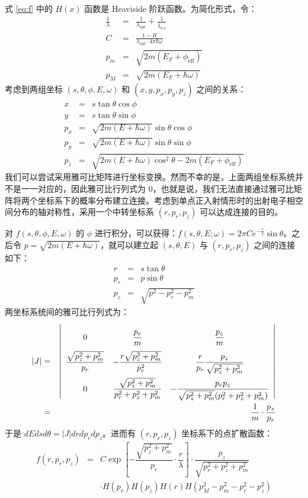 式 \ref{eq:f} 中的 $H(x)$ 函数是 Heaviside 阶跃函数。为简化形式，令：
\begin{eqnarray}
\frac{1}{\lambda} &=& \frac{1}{\lambda_{\text{opt}}} + \frac{1}{\bar{\lambda}_{\text{e-e}}}\nonumber\\
C &=& \frac{1-R}{\lambda_{\text{opt}}\cdot 4\pi\hbar\omega}\\
p_m &=& \sqrt{2m(E_F+\phi_{\text{eff}})}\nonumber\\
p_M &=& \sqrt{2m(E_F+\hbar\omega)}\nonumber
\label{eq:pm}
\end{eqnarray}
考虑到两组坐标 $(s, \theta, \phi, E, \omega)$ 和 $(x, y, p_x, p_y, p_z)$ 之间的关系：
\begin{eqnarray}
x &=& s\tan\theta\cos\phi\nonumber\\
y &=& s\tan\theta\sin\phi \nonumber\\
p_x &=& \sqrt{2m(E+\hbar\omega)}\sin\theta\cos\phi\\
p_y &=& \sqrt{2m(E+\hbar\omega)}\sin\theta\sin\phi\nonumber\\
p_z &=& \sqrt{2m(E+\hbar\omega)\cos^2\theta - 2m(E_F+\phi_{\text{eff}})}\nonumber
\label{eq:trans}
\end{eqnarray}
我们可以尝试采用雅可比矩阵进行坐标变换。然而不幸的是，上面两组坐标系统并不是一一对应的，因此雅可比行列式为 0，也就是说，我们无法直接通过雅可比矩阵将两个坐标系下的概率分布建立连接。考虑到单点正入射情形时的出射电子相空间分布的轴对称性，采用一个中转坐标系 $(r, p_r, p_z)$ 可以达成连接的目的。

对 $f(s, \theta, \phi, E, \omega)$ 的 $\phi$ 进行积分，可以获得：$f(s,\theta,E;\omega) = 2\pi Ce^{-\frac{s}{\lambda}}\sin\theta$。之后令 $p=\sqrt{2m(E+\hbar\omega)}$，就可以建立起 $(s,\theta,E)$ 与 $(r, p_r, p_z)$ 之间的连接如下：
\begin{eqnarray}
r &=& s\tan\theta\nonumber\\
p_r &=& p\sin\theta\\
p_z &=& \sqrt{p^2-p_r^2-p_m^2}\nonumber
\label{eq:apatrans}
\end{eqnarray}
两坐标系统间的雅可比行列式为：
\begin{eqnarray}
|J| &=& \left|
\renewcommand{\arraystretch}{2.5}
\begin{array}{ccc}
0 & \dfrac{p_r}{m} & \dfrac{p_z}{m} \\
\dfrac{\sqrt{p_z^2+p_m^2}}{p_r} & -\dfrac{r\sqrt{p_z^2+p_m^2}}{p_r^2} & \dfrac{r}{p_r}\dfrac{p_z}{\sqrt{p_z^2+p_m^2}} \\
0 & \dfrac{\sqrt{p_z^2+p_m^2}}{p_r^2+p_z^2+p_m^2} & -\dfrac{p_rp_z}{\sqrt{p_z^2+p_m^2}(p_r^2+p_z^2+p_m^2)}
\end{array} \right|\nonumber\\
&=& \dfrac{1}{m}\cdot\dfrac{p_z}{p_r}
\end{eqnarray}
于是 $dEdsd\theta = |J|drdp_rdp_z$。进而有 $(r, p_r, p_z)$ 坐标系下的点扩散函数：
\begin{eqnarray}
f(r, p_r, p_z)&=&C\exp\left[-\dfrac{\sqrt{p_z^2+p_m^2}}{p_r}\cdot\dfrac{r}{\lambda}\right]\cdot\dfrac{p_z}{\sqrt{p_r^2+p_z^2+p_m^2}}\nonumber\\
&&\cdot H(p_r)H(p_z)H(r)H(p_M^2-p_m^2-p_r^2-p_z^2)
\end{eqnarray}


